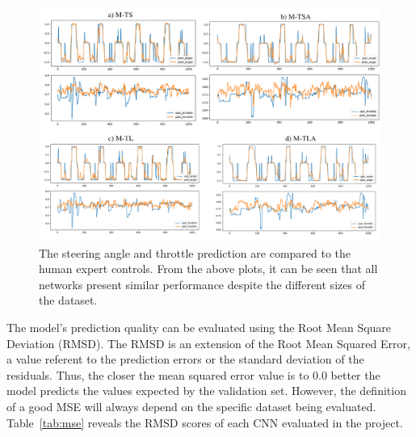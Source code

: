 \documentclass[12pt]{article}
\begin{document}
\begin{figure} [H]
\begin{center}
\includegraphics[width=1.0\textwidth]{figures/predictions.png}
\caption{ The steering angle and throttle prediction are compared to the human expert controls. From the above plots, it can be seen that all networks present similar performance despite the different sizes of the dataset.}
\label{fig:predictions}
\end{center}
\end{figure}

The model's prediction quality can be evaluated using the Root Mean Square Deviation (RMSD). The RMSD is an extension of the Root Mean Squared Error, a value referent to the prediction errors or the standard deviation of the residuals. Thus, the closer the mean squared error value is to 0.0 better the model predicts the values expected by the validation set. However, the definition of a good MSE will always depend on the specific dataset being evaluated. Table~\ref{tab:mse} reveals the RMSD scores of each CNN evaluated in the project. 
\end{document}
